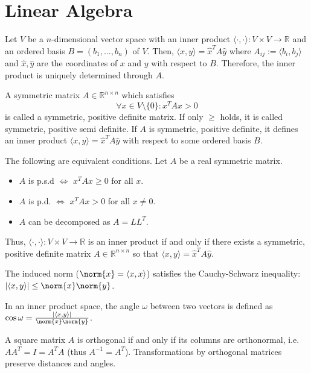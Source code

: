 \section{Linear Algebra}

Let $V$ be a $n$-dimensional vector space
with an inner product $\langle\cdot,\cdot\rangle : V \times V \to \mathbb{R}$
and an ordered basis $B = (b_1, \dotsc, b_n)$ of $V$.
Then, $\langle x, y \rangle = \hat{x}^T A \hat{y}$ where
$A_{ij} := \langle b_i, b_j \rangle$ and $\hat{x}, \hat{y}$ are the coordinates
of $x$ and $y$ with respect to $B$.
Therefore, the inner product is uniquely determined through $A$.

A symmetric matrix $A \in \mathbb{R}^{n \times n}$ which satisfies
\begin{equation*}
    \forall x \in V \setminus \{0\} : x^T A x > 0
\end{equation*}
is called a symmetric, positive definite matrix.
If only $\geq$ holds, it is called symmetric, positive semi definite.
If $A$ is symmetric, positive definite, it defines an inner product $\langle x, y \rangle = \hat{x}^T A \hat{y}$
with respect to some ordered basis $B$.

The following are equivalent conditions.
Let $A$ be a real symmetric matrix.
\begin{itemize}
    \item $A$ is p.s.d $\Longleftrightarrow$ $x^T Ax \geq 0$ for all $x$.
    \item $A$ is p.d. $\Longleftrightarrow$ $x^T Ax > 0$ for all $x \neq 0$.
    \item $A$ can be decomposed as $A = L L^T$.
\end{itemize}

Thus, $\langle\cdot,\cdot\rangle : V \times V \to \mathbb{R}$ is an inner product if and only if
there exists a symmetric, positive definite matrix $A \in \mathbb{R}^{n \times n}$ so that
$\langle x, y \rangle = \hat{x}^T A \hat{y}$.

The induced norm ($\norm{x} = \langle x, x \rangle$) satisfies the Cauchy-Schwarz inequality:
$| \langle x, y \rangle | \leq \norm{x} \norm{y}$.

In an inner product space, the angle $\omega$ between two vectors is defined as
$\cos{\omega} = \frac{| \langle x, y \rangle |}{\norm{x} \norm{y}}$.

A square matrix $A$ is orthogonal if and only if its columns are orthonormal, i.e.
$A A^T = I = A^T A$ (thus $A^{-1} = A^T$).
Transformations by orthogonal matrices preserve distances and angles.

